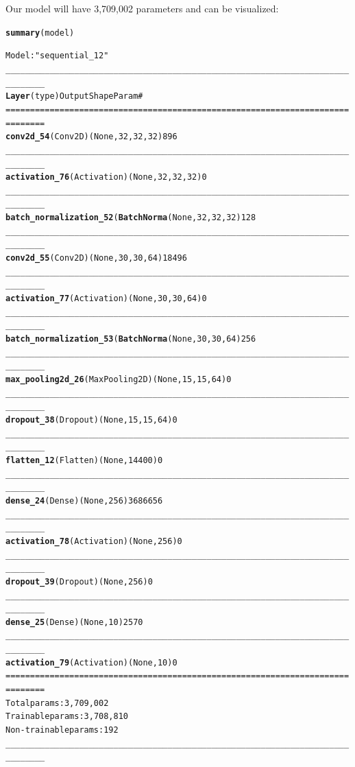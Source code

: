 \documentclass[letter]{article}\usepackage[]{graphicx}\usepackage[]{color}
\makeatletter
\newcommand{\hlstr}[1]{\textcolor[rgb]{0.192,0.494,0.8}{#1}}%
\newcommand{\hlcom}[1]{\textcolor[rgb]{0.678,0.584,0.686}{\textit{#1}}}%
\newcommand{\hlkwd}[1]{\textcolor[rgb]{0.737,0.353,0.396}{\textbf{#1}}}%
\newenvironment{kframe}{%
 \def\at@end@of@kframe{}%
 \ifinner\ifhmode%
  \def\at@end@of@kframe{\end{minipage}}%
  \begin{minipage}{\columnwidth}%
 \fi\fi%
 \def\FrameCommand##1{\hskip\@totalleftmargin \hskip-\fboxsep
 \colorbox{shadecolor}{##1}\hskip-\fboxsep
     \hskip-\linewidth \hskip-\@totalleftmargin \hskip\columnwidth}%
 \MakeFramed {\advance\hsize-\width
   \@totalleftmargin\z@ \linewidth\hsize
   \@setminipage}}%
 {\par\unskip\endMakeFramed%
 \at@end@of@kframe}
\newenvironment{knitrout}{}{} %
\makeatother
\begin{document}
Our model will have 3,709,002 parameters and can be visualized:
\begin{knitrout}
\color{fgcolor}\begin{kframe}
\begin{alltt}
\hlkwd{summary}(model)

Model: \hlstr{"sequential_12"}
______________________________________________________________________________
\hlkwd{Layer} (type)                       Output Shape                   Param \hlcom{#     }
==============================================================================
\hlkwd{conv2d_54} (Conv2D)                 (None, 32, 32, 32)             896         
______________________________________________________________________________
\hlkwd{activation_76} (Activation)         (None, 32, 32, 32)             0           
______________________________________________________________________________
\hlkwd{batch_normalization_52} (\hlkwd{BatchNorma} (None, 32, 32, 32)             128         
______________________________________________________________________________
\hlkwd{conv2d_55} (Conv2D)                 (None, 30, 30, 64)             18496       
______________________________________________________________________________
\hlkwd{activation_77} (Activation)         (None, 30, 30, 64)             0           
______________________________________________________________________________
\hlkwd{batch_normalization_53} (\hlkwd{BatchNorma} (None, 30, 30, 64)             256         
______________________________________________________________________________
\hlkwd{max_pooling2d_26} (MaxPooling2D)    (None, 15, 15, 64)             0           
______________________________________________________________________________
\hlkwd{dropout_38} (Dropout)               (None, 15, 15, 64)             0           
______________________________________________________________________________
\hlkwd{flatten_12} (Flatten)               (None, 14400)                  0           
______________________________________________________________________________
\hlkwd{dense_24} (Dense)                   (None, 256)                    3686656     
______________________________________________________________________________
\hlkwd{activation_78} (Activation)         (None, 256)                    0           
______________________________________________________________________________
\hlkwd{dropout_39} (Dropout)               (None, 256)                    0           
______________________________________________________________________________
\hlkwd{dense_25} (Dense)                   (None, 10)                     2570        
______________________________________________________________________________
\hlkwd{activation_79} (Activation)         (None, 10)                     0           
==============================================================================
Total params: 3,709,002
Trainable params: 3,708,810
Non-trainable params: 192
______________________________________________________________________________
\end{alltt}
\end{kframe}
\end{knitrout}
\end{document}

